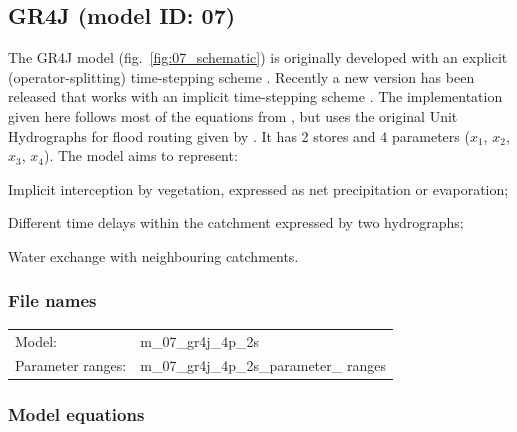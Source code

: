 \subsection{GR4J (model ID: 07)}
The GR4J model (fig.~\ref{fig:07_schematic}) is originally developed with an explicit (operator-splitting) time-stepping scheme \citep{Perrin2003}. Recently a new version has been released that works with an implicit time-stepping scheme \citep{Santos2017}. The implementation given here follows most of the equations from \citet{Santos2017}, but uses the original Unit Hydrographs for flood routing given by \citet{Perrin2003}. It has 2 stores and 4 parameters ($x_1$, $x_2$, $x_3$, $x_4$). The model aims to represent:

\begin{itemizecompact}
\item Implicit interception by vegetation, expressed as net precipitation or evaporation;
\item Different time delays within the catchment expressed by two hydrographs;
\item Water exchange with neighbouring catchments.
\end{itemizecompact}

\subsubsection{File names}
\begin{tabular}{@{}ll}
Model: &m\_07\_gr4j\_4p\_2s \\
Parameter ranges: &m\_07\_gr4j\_4p\_2s\_parameter\_ ranges \\
\end{tabular}

\subsubsection{Model equations}

